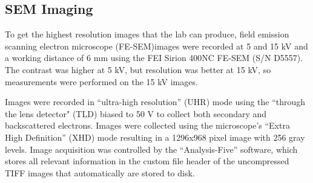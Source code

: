 \subsection{SEM Imaging}

To get the highest resolution images that the lab can produce,
field emission scanning electron microscope (FE-SEM)images were
recorded at 5 and 15 kV and a working distance of 6 mm using the FEI
Sirion 400NC FE-SEM (S/N D5557). The contrast was higher at 5 kV,
but resolution was better at 15 kV, so measurements were performed
on the 15 kV images.

Images were recorded in ``ultra-high resolution'' (UHR) mode
using the ``through the lens detector" (TLD)
biased to 50 V to collect both secondary and backscattered electrons.
Images were collected using the microscope's ``Extra High Definition''
(XHD) mode resulting in a 1296x968 pixel image with 256 gray levels.
Image acquisition was controlled by the ``Analysis-Five'' software,
which stores all relevant information in the custom file header of
the uncompressed TIFF images that automatically are stored to disk.

\endinput
